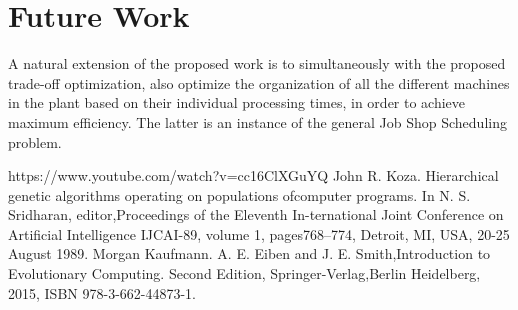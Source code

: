 \documentclass{IEEEtran}
\begin{document}
\section{Future Work}
A natural extension of the proposed work is to simultaneously with the proposed trade-off optimization, also optimize the organization of all the different machines in the plant based on their individual processing times, in order to achieve maximum efficiency. The latter is an instance of the general Job Shop Scheduling problem.

\begin{thebibliography}{00}
 https://www.youtube.com/watch?v=cc16ClXGuYQ
 John R. Koza.   Hierarchical genetic algorithms operating on populations ofcomputer programs.  In N. S. Sridharan, editor,Proceedings of the Eleventh In-ternational Joint Conference on Artificial Intelligence IJCAI-89, volume 1, pages768–774, Detroit, MI, USA, 20-25 August 1989. Morgan Kaufmann.
 A. E. Eiben and J. E. Smith,Introduction to Evolutionary Computing. Second Edition, Springer-Verlag,Berlin Heidelberg, 2015, ISBN 978-3-662-44873-1.
\end{thebibliography}
\end{document}
